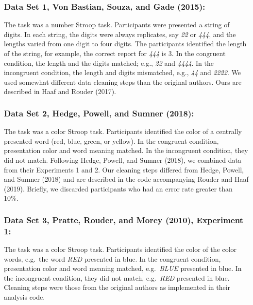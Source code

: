 \documentclass[
  english,
  ,man]{apa6}
\begin{document}
\hypertarget{data-set-1-vonbastianetal2015}{%
\subsubsection{Data Set 1, Von Bastian, Souza, and Gade (2015):}\label{data-set-1-vonbastianetal2015}}

The task was a number Stroop task. Participants were presented a string of digits. In each string, the digits were always replicates, say \emph{22} or \emph{444}, and the lengths varied from one digit to four digits. The participants identified the length of the string, for example, the correct report for \emph{444} is 3. In the congruent condition, the length and the digits matched; e.g., \emph{22} and \emph{4444}. In the incongruent condition, the length and digits mismatched, e.g., \emph{44} and \emph{2222}. We used somewhat different data cleaning steps than the original authors. Ours are described in Haaf and Rouder (2017).

\hypertarget{data-set-2-hedgeetal2018}{%
\subsubsection{Data Set 2, Hedge, Powell, and Sumner (2018):}\label{data-set-2-hedgeetal2018}}

The task was a color Stroop task. Participants identified the color of a centrally presented word (red, blue, green, or yellow). In the congruent condition, presentation color and word meaning matched. In the incongruent condition, they did not match. Following Hedge, Powell, and Sumner (2018), we combined data from their Experiments 1 and 2. Our cleaning steps differed from Hedge, Powell, and Sumner (2018) and are described in the code accompanying Rouder and Haaf (2019). Briefly, we discarded participants who had an error rate greater than 10\%.

\hypertarget{data-set-3-pratteetal2010-experiment-1}{%
\subsubsection{Data Set 3, Pratte, Rouder, and Morey (2010), Experiment 1:}\label{data-set-3-pratteetal2010-experiment-1}}

The task was a color Stroop task. Participants identified the color of the color words, e.g.~the word \emph{RED} presented in blue. In the congruent condition, presentation color and word meaning matched, e.g.~\emph{BLUE} presented in blue. In the incongruent condition, they did not match, e.g.~\emph{RED} presented in blue. Cleaning steps were those from the original authors as implemented in their analysis code.
\end{document}
